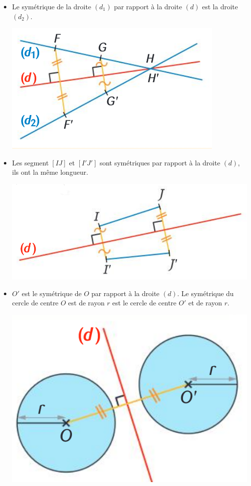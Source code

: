 \documentclass[12pt,a4paper]{article}
\begin{document}
	\begin{myexs}
		\begin{itemize}
			\item Le symétrique de la droite $(d_1)$ par rapport à la droite $(d)$ est la droite $(d_2)$.
			\begin{center}
				\includegraphics[scale=0.6]{prop1}
			\end{center}
		
			\item Les segment $[IJ]$ et $[I'J']$ sont symétriques par rapport à la droite $(d)$, ils ont la même longueur.
			\begin{center}
				\includegraphics[scale=0.4]{prop2}
			\end{center}
		
		
			\item $O'$ est le symétrique de $O$ par rapport à la droite $(d)$. Le symétrique du cercle de centre $O$ est de rayon $r$ est le cercle de centre $O'$ et de rayon $r$.
			\begin{center}
				\includegraphics[scale=0.4]{prop3}
			\end{center}
		\end{itemize}
	\end{myexs}
\end{document}

